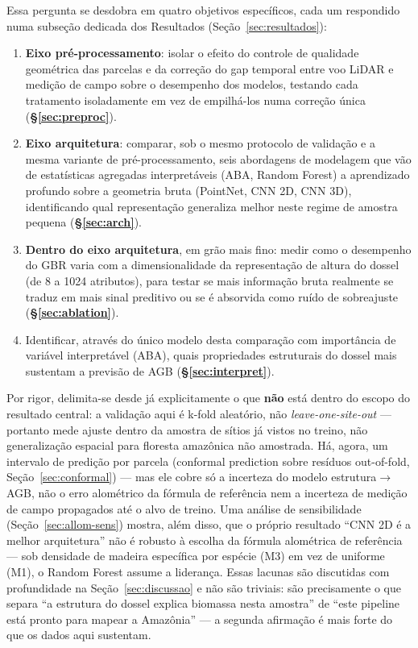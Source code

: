 Essa pergunta se desdobra em quatro objetivos específicos, cada um respondido
numa subseção dedicada dos Resultados (Seção~\ref{sec:resultados}):

\begin{enumerate}
  \item \textbf{Eixo pré-processamento}: isolar o efeito do controle de
    qualidade geométrica das parcelas e da correção do gap temporal entre voo
    LiDAR e medição de campo sobre o desempenho dos modelos, testando cada
    tratamento isoladamente em vez de empilhá-los numa correção única
    (\textbf{§\ref{sec:preproc}}).
  \item \textbf{Eixo arquitetura}: comparar, sob o mesmo protocolo de
    validação e a mesma variante de pré-processamento, seis abordagens de
    modelagem que vão de estatísticas agregadas interpretáveis (ABA, Random
    Forest) a aprendizado profundo sobre a geometria bruta (PointNet, CNN 2D,
    CNN 3D), identificando qual representação generaliza melhor neste regime de
    amostra pequena (\textbf{§\ref{sec:arch}}).
  \item \textbf{Dentro do eixo arquitetura}, em grão mais fino: medir como o
    desempenho do GBR varia com a dimensionalidade da representação de altura
    do dossel (de 8 a 1024 atributos), para testar se mais informação bruta
    realmente se traduz em mais sinal preditivo ou se é absorvida como ruído
    de sobreajuste (\textbf{§\ref{sec:ablation}}).
  \item Identificar, através do único modelo desta comparação com importância de
    variável interpretável (ABA), quais propriedades estruturais do dossel mais
    sustentam a previsão de AGB (\textbf{§\ref{sec:interpret}}).
\end{enumerate}

Por rigor, delimita-se desde já explicitamente o que \textbf{não} está dentro do escopo do
resultado central: a validação aqui é k-fold aleatório, não
\textit{leave-one-site-out} --- portanto mede ajuste dentro da amostra de sítios
já vistos no treino, não generalização espacial para floresta amazônica não
amostrada. Há, agora, um intervalo de predição por parcela (conformal prediction
sobre resíduos out-of-fold, Seção~\ref{sec:conformal}) --- mas ele cobre só a
incerteza do modelo estrutura$\rightarrow$AGB, não o erro alométrico da fórmula de
referência nem a incerteza de medição de campo propagados até o alvo de treino.
Uma análise de sensibilidade (Seção~\ref{sec:allom-sens}) mostra, além disso, que
o próprio resultado ``CNN 2D é a melhor arquitetura'' não é robusto à escolha da
fórmula alométrica de referência --- sob densidade de madeira específica por
espécie (M3) em vez de uniforme (M1), o Random Forest assume a liderança. Essas
lacunas são discutidas com profundidade na Seção~\ref{sec:discussao} e não são
triviais: são precisamente o que separa ``a estrutura do dossel explica biomassa
nesta amostra'' de ``este pipeline está pronto para mapear a Amazônia'' --- a
segunda afirmação é mais forte do que os dados aqui sustentam.

